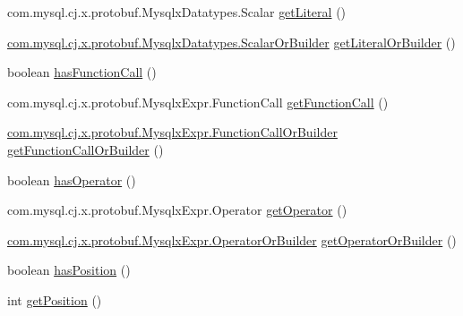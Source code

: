 \begin{DoxyCompactItemize}
com.\+mysql.\+cj.\+x.\+protobuf.\+Mysqlx\+Datatypes.\+Scalar \mbox{\hyperlink{interfacecom_1_1mysql_1_1cj_1_1x_1_1protobuf_1_1_mysqlx_expr_1_1_expr_or_builder_a19b08322a357ba862de44dcad49f7cda}{get\+Literal}} ()
\item 
\mbox{\hyperlink{interfacecom_1_1mysql_1_1cj_1_1x_1_1protobuf_1_1_mysqlx_datatypes_1_1_scalar_or_builder}{com.\+mysql.\+cj.\+x.\+protobuf.\+Mysqlx\+Datatypes.\+Scalar\+Or\+Builder}} \mbox{\hyperlink{interfacecom_1_1mysql_1_1cj_1_1x_1_1protobuf_1_1_mysqlx_expr_1_1_expr_or_builder_a40b27e778b938087c6c502489d9bd5da}{get\+Literal\+Or\+Builder}} ()
\item 
boolean \mbox{\hyperlink{interfacecom_1_1mysql_1_1cj_1_1x_1_1protobuf_1_1_mysqlx_expr_1_1_expr_or_builder_a9222ec4038c26977953462522bc63ae8}{has\+Function\+Call}} ()
\item 
com.\+mysql.\+cj.\+x.\+protobuf.\+Mysqlx\+Expr.\+Function\+Call \mbox{\hyperlink{interfacecom_1_1mysql_1_1cj_1_1x_1_1protobuf_1_1_mysqlx_expr_1_1_expr_or_builder_a26e4fb47a70f6750e31c7591604157c2}{get\+Function\+Call}} ()
\item 
\mbox{\hyperlink{interfacecom_1_1mysql_1_1cj_1_1x_1_1protobuf_1_1_mysqlx_expr_1_1_function_call_or_builder}{com.\+mysql.\+cj.\+x.\+protobuf.\+Mysqlx\+Expr.\+Function\+Call\+Or\+Builder}} \mbox{\hyperlink{interfacecom_1_1mysql_1_1cj_1_1x_1_1protobuf_1_1_mysqlx_expr_1_1_expr_or_builder_a32bdbfd8c65a87b891d8d671686df466}{get\+Function\+Call\+Or\+Builder}} ()
\item 
boolean \mbox{\hyperlink{interfacecom_1_1mysql_1_1cj_1_1x_1_1protobuf_1_1_mysqlx_expr_1_1_expr_or_builder_a91f643451687279ed1fa0fedb55e5c8c}{has\+Operator}} ()
\item 
com.\+mysql.\+cj.\+x.\+protobuf.\+Mysqlx\+Expr.\+Operator \mbox{\hyperlink{interfacecom_1_1mysql_1_1cj_1_1x_1_1protobuf_1_1_mysqlx_expr_1_1_expr_or_builder_adbb25fbdc0ead8ec2e9cd1d301430169}{get\+Operator}} ()
\item 
\mbox{\hyperlink{interfacecom_1_1mysql_1_1cj_1_1x_1_1protobuf_1_1_mysqlx_expr_1_1_operator_or_builder}{com.\+mysql.\+cj.\+x.\+protobuf.\+Mysqlx\+Expr.\+Operator\+Or\+Builder}} \mbox{\hyperlink{interfacecom_1_1mysql_1_1cj_1_1x_1_1protobuf_1_1_mysqlx_expr_1_1_expr_or_builder_ae2431b7310ea3bedf64e6dfaace1dea0}{get\+Operator\+Or\+Builder}} ()
\item 
boolean \mbox{\hyperlink{interfacecom_1_1mysql_1_1cj_1_1x_1_1protobuf_1_1_mysqlx_expr_1_1_expr_or_builder_aa55598c574c0ee9795b64be95bffddeb}{has\+Position}} ()
\item 
int \mbox{\hyperlink{interfacecom_1_1mysql_1_1cj_1_1x_1_1protobuf_1_1_mysqlx_expr_1_1_expr_or_builder_aa705f40ebb0a14b92921609ebd1a30f7}{get\+Position}} ()

\end{DoxyCompactItemize}

